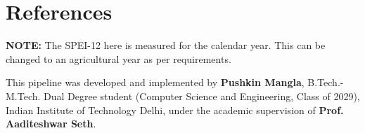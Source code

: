 \documentclass[12pt, a4paper]{article}
\begin{document}
\clearpage %

\section{References}
\printbibliography

\vspace{1cm}
\noindent \textbf{NOTE:} The SPEI-12 here is measured for the calendar year. This can be changed to an agricultural year as per requirements.

\vspace{1.5cm}

\noindent This pipeline was developed and implemented by \textbf{Pushkin Mangla}, B.Tech.-M.Tech. Dual Degree student (Computer Science and Engineering, Class of 2029), Indian Institute of Technology Delhi, under the academic supervision of \textbf{Prof. Aaditeshwar Seth}.
\end{document}
